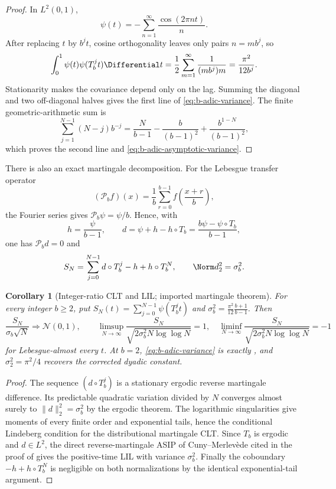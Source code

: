 \documentclass[11pt,oneside]{article}
\numberwithin{equation}{section}
\newtheorem{corollary}[theorem]{Corollary}
\theoremstyle{definition}
\theoremstyle{remark}
\begin{document}
\begin{proof}
In $L^2(0,1)$,
\[
 \psi(t)=-\sum_{n=1}^{\infty}\frac{\cos(2\pi nt)}n.
\]
After replacing $t$ by $b^jt$, cosine orthogonality leaves only pairs
$n=mb^j$, so
\[
 \int_0^1\psi(t)\psi(T_b^jt)\Differential t
 =\frac12\sum_{m=1}^{\infty}\frac1{(mb^j)m}
 =\frac{\pi^2}{12b^j}.
\]
Stationarity makes the covariance depend only on the lag.  Summing the diagonal and two
off-diagonal halves gives the first line of \eqref{eq:b-adic-variance}.  The finite
geometric-arithmetic sum is
\[
 \sum_{j=1}^{N-1}(N-j)b^{-j}
 =\frac{N}{b-1}-\frac{b}{(b-1)^2}
  +\frac{b^{1-N}}{(b-1)^2},
\]
which proves the second line and \eqref{eq:b-adic-asymptotic-variance}.
\end{proof}

There is also an exact martingale decomposition.  For the Lebesgue transfer operator
\[
 (\mathcal P_bf)(x)=\frac1b\sum_{r=0}^{b-1}
 f\!\left(\frac{x+r}{b}\right),
\]
the Fourier series gives $\mathcal P_b\psi=\psi/b$.  Hence, with
\[
 h=\frac{\psi}{b-1},
 \qquad d=\psi+h-h\circ T_b
 =\frac{b\psi-\psi\circ T_b}{b-1},
\]
one has $\mathcal P_bd=0$ and
\begin{equation}
 S_N=\sum_{j=0}^{N-1}d\circ T_b^j-h+h\circ T_b^N,
 \qquad \Norm d_2^2=\sigma_b^2.
 \label{eq:b-adic-Gordin}
\end{equation}
\begin{corollary}[Integer-ratio CLT and LIL; imported martingale theorem]
\label{cor:b-adic-clt-lil}
For every integer $b\ge2$, put
$S_N(t)=\sum_{j=0}^{N-1}\psi(T_b^jt)$ and
$\sigma_b^2=\frac{\pi^2}{12}\frac{b+1}{b-1}$.  Then
\[
 \frac{S_N}{\sigma_b\sqrt N}\Longrightarrow\mathcal N(0,1),
 \qquad
 \limsup_{N\to\infty}
 \frac{S_N}{\sqrt{2\sigma_b^2N\log\log N}}=1,
 \quad
 \liminf_{N\to\infty}
 \frac{S_N}{\sqrt{2\sigma_b^2N\log\log N}}=-1
\]
for Lebesgue-almost every $t$.  At $b=2$, \eqref{eq:b-adic-variance} is exactly
, and $\sigma_2^2=\pi^2/4$ recovers the corrected dyadic
constant.
\end{corollary}

\begin{proof}
The sequence $(d\circ T_b^j)$ is a stationary ergodic reverse martingale difference.
Its predictable quadratic variation divided by $N$ converges almost surely to
$\|d\|_2^2=\sigma_b^2$ by the ergodic theorem.  The logarithmic singularities give moments
of every finite order and exponential tails, hence the conditional Lindeberg condition for
the distributional martingale CLT.  Since $T_b$ is ergodic and $d\in L^2$, the direct
reverse-martingale ASIP of Cuny--Merlev\`ede cited in the proof of
 gives the positive-time LIL with variance $\sigma_b^2$.  Finally the coboundary
$-h+h\circ T_b^N$ is negligible on both normalizations by the identical exponential-tail
argument.
\end{proof}
\end{document}
